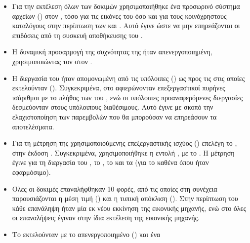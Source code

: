 \begin{itemize}
    \item Για την εκτέλεση όλων των δοκιμών χρησιμοποιήθηκε ένα προσωρινό
          σύστημα αρχείων () %
          στον \host{}, τόσο για τις εικόνες του \osv{} όσο και για τους
          κοινόχρηστους καταλόγους στην περίπτωση των \viofs{} και .
          Αυτό έγινε ώστε να μην επηρεάζονται οι επιδόσεις από τη συσκευή
          αποθήκευσης του \host{}.
    \item Η δυναμική προσαρμογή της συχνότητας της  ήταν
          απενεργοποιημένη, χρησιμοποιώντας τον  %
          στον \host{}.
    \item Η διεργασία του \qemu{} ήταν απομονωμένη από τις υπόλοιπες
          () ως προς τις  στις οποίες
          εκτελούνταν (). %
          Συγκεκριμένα, στο \qemu{} αφιερώνονταν επεξεργαστικοί πυρήνες
          ισάριθμοι με το πλήθος των  του \guest{}, ενώ οι υπόλοιπες
          προαναφερόμενες διεργασίες δεσμεύονταν στους υπόλοιπους διαθέσιμους.
          Αυτό έγινε με σκοπό την ελαχιστοποίηση των παρεμβολών που θα μπορούσαν
          να επηρεάσουν τα αποτελέσματα.
    \item Για τη μέτρηση της χρησιμοποιούμενης επεξεργαστικής ισχύος () επελέγη το  \cite{perf}, στην έκδοση
          . Συγκεκριμένα, χρησιμοποιήθηκε η εντολή
          \texttt{}, με το . Η
          μέτρηση έγινε για τη διεργασία του \qemu{}, το , το
           \cite{stfanha:vhost} και τα  (για το καθένα όπου ήταν εφαρμόσιμο).
    \item Όλες οι δοκιμές επαναλήφθηκαν 10 φορές, από τις οποίες στη συνέχεια
          παρουσιάζονται η μέση τιμή () και η τυπική απόκλιση
          (). Στην περίπτωση του \osv{} κάθε επανάληψη
          ήταν μία εκ νέου εκκίνηση της εικονικής μηχανής, ενώ στο \linux{} όλες
          οι επαναλήψεις έγιναν στην ίδια εκτέλεση της εικονικής μηχανής.
    \item Το  εκτελούνταν με το  απενεργοποιημένο
          (\texttt{}) και ένα 

\end{itemize}
